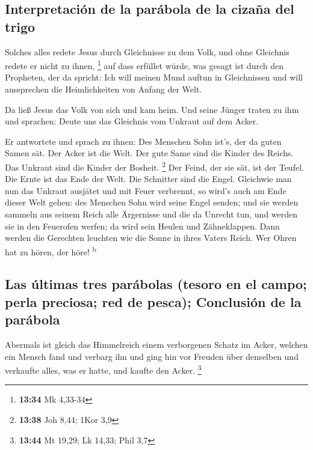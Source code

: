 \hypertarget{interpretaciuxf3n-de-la-paruxe1bola-de-la-cizauxf1a-del-trigo}{%
\subsection{Interpretación de la parábola de la cizaña del
trigo}\label{interpretaciuxf3n-de-la-paruxe1bola-de-la-cizauxf1a-del-trigo}}

 Solches alles redete Jesus durch Gleichnisse zu dem
Volk, und ohne Gleichnis redete er nicht zu ihnen, \footnote{\textbf{13:34}
  Mk 4,33-34}  auf dass erfüllet würde, was gesagt ist
durch den Propheten, der da spricht: Ich will meinen Mund auftun in
Gleichnissen und will aussprechen die Heimlichkeiten von Anfang der
Welt.

 Da ließ Jesus das Volk von sich und kam heim. Und seine
Jünger traten zu ihm und sprachen: Deute uns das Gleichnis vom Unkraut
auf dem Acker.

 Er antwortete und sprach zu ihnen: Des Menschen Sohn
ist's, der da guten Samen sät.  Der Acker ist die Welt.
Der gute Same sind die Kinder des Reichs. Das Unkraut sind die Kinder
der Bosheit. \footnote{\textbf{13:38} Joh 8,44; 1Kor 3,9}
 Der Feind, der sie sät, ist der Teufel. Die Ernte ist
das Ende der Welt. Die Schnitter sind die Engel. 
Gleichwie man nun das Unkraut ausjätet und mit Feuer verbrennt, so
wird's auch am Ende dieser Welt gehen:  des Menschen Sohn
wird seine Engel senden; und sie werden sammeln aus seinem Reich alle
Ärgernisse und die da Unrecht tun,  und werden sie in den
Feuerofen werfen; da wird sein Heulen und Zähneklappen. 
Dann werden die Gerechten leuchten wie die Sonne in ihres Vaters Reich.
Wer Ohren hat zu hören, der höre! \textsuperscript{b}

\hypertarget{las-uxfaltimas-tres-paruxe1bolas-tesoro-en-el-campo-perla-preciosa-red-de-pesca-conclusiuxf3n-de-la-paruxe1bola}{%
\subsection{Las últimas tres parábolas (tesoro en el campo; perla
preciosa; red de pesca); Conclusión de la
parábola}\label{las-uxfaltimas-tres-paruxe1bolas-tesoro-en-el-campo-perla-preciosa-red-de-pesca-conclusiuxf3n-de-la-paruxe1bola}}

 Abermals ist gleich das Himmelreich einem verborgenen
Schatz im Acker, welchen ein Mensch fand und verbarg ihn und ging hin
vor Freuden über denselben und verkaufte alles, was er hatte, und kaufte
den Acker. \footnote{\textbf{13:44} Mt 19,29; Lk 14,33; Phil 3,7}

